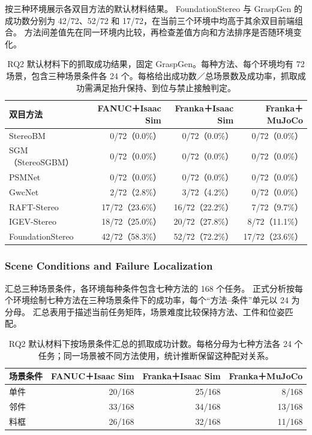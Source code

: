 \documentclass[UTF8,fontset=fandol,a4paper,11pt]{ctexart}
\begin{document}
按三种环境展示各双目方法的默认材料结果。
FoundationStereo 与 GraspGen 的成功数分别为 42/72、52/72 和 17/72，在当前三个环境中均高于其余双目前端组合。
方法间差值先在同一环境内比较，再检查差值方向和方法排序是否随环境变化。

\begin{table}[H]
\centering\small
\caption{RQ2 默认材料下的抓取成功结果，固定 GraspGen。每种方法、每个环境均有 72 场景，包含三种场景条件各 24 个。每格给出成功数／总场景数及成功率，抓取成功需满足抬升保持、到位与禁止接触判定。}
\label{tab:rq2}
\begin{tabularx}{\linewidth}{Y r r r}
\toprule
双目方法 & FANUC＋Isaac Sim & Franka＋Isaac Sim & Franka＋MuJoCo \\
\midrule
StereoBM & 0/72（0.0\%） & 0/72（0.0\%） & 0/72（0.0\%） \\
SGM（StereoSGBM） & 0/72（0.0\%） & 0/72（0.0\%） & 0/72（0.0\%） \\
PSMNet & 0/72（0.0\%） & 0/72（0.0\%） & 0/72（0.0\%） \\
GwcNet & 2/72（2.8\%） & 3/72（4.2\%） & 0/72（0.0\%） \\
RAFT-Stereo & 17/72（23.6\%） & 16/72（22.2\%） & 7/72（9.7\%） \\
IGEV-Stereo & 18/72（25.0\%） & 20/72（27.8\%） & 8/72（11.1\%） \\
FoundationStereo & 42/72（58.3\%） & 52/72（72.2\%） & 17/72（23.6\%） \\
\bottomrule
\end{tabularx}
\end{table}

\subsubsection{Scene Conditions and Failure Localization}

汇总三种场景条件，各环境每种条件包含七种方法的 168 个任务。
正式分析按每个环境绘制七种方法在三种场景条件下的成功率，每个“方法--条件”单元以 24 为分母。
汇总表用于描述当前任务矩阵，场景难度比较保持方法、工件和位姿匹配。

\begin{table}[H]
\centering\small
\caption{RQ2 默认材料下按场景条件汇总的抓取成功计数。每格分母为七种方法各 24 个任务；同一场景被不同方法使用，统计推断保留这种配对关系。}
\label{tab:rq2-scenes}
\begin{tabularx}{\linewidth}{Y r r r}
\toprule
场景条件 & FANUC＋Isaac Sim & Franka＋Isaac Sim & Franka＋MuJoCo \\
\midrule
单件 & 20/168 & 25/168 & 8/168 \\
邻件 & 33/168 & 34/168 & 13/168 \\
料框 & 26/168 & 32/168 & 11/168 \\
\bottomrule
\end{tabularx}
\end{table}
\end{document}
